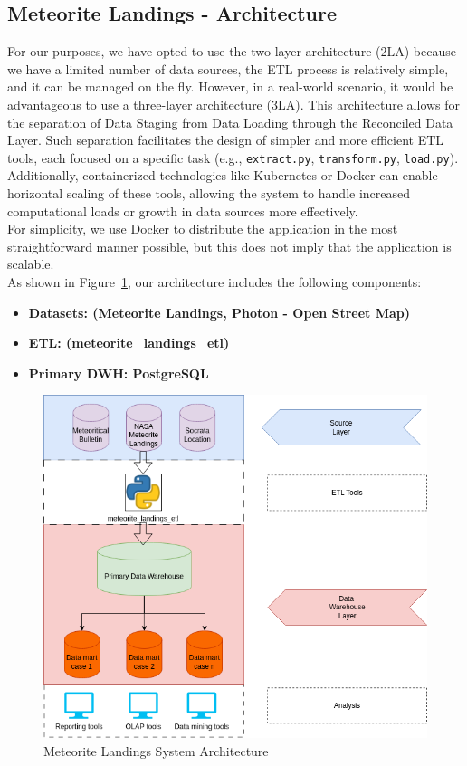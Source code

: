 \documentclass[conference]{IEEEtran}
\begin{document}
	\subsection{Meteorite Landings - Architecture}
	For our purposes, we have opted to use the two-layer architecture (2LA) because we have a limited number of data sources, the ETL process is relatively simple, and it can be managed on the fly. However, in a real-world scenario, it would be advantageous to use a three-layer architecture (3LA). This architecture allows for the separation of Data Staging from Data Loading through the Reconciled Data Layer. Such separation facilitates the design of simpler and more efficient ETL tools, each focused on a specific task (e.g., \texttt{extract.py}, \texttt{transform.py}, \texttt{load.py}). Additionally, containerized technologies like Kubernetes or Docker can enable horizontal scaling of these tools, allowing the system to handle increased computational loads or growth in data sources more effectively.\\For simplicity, we use Docker to distribute the application in the most straightforward manner possible, but this does not imply that the application is scalable.\\As shown in Figure~\ref{fig:Meteorite Landings System Architecture}, our architecture includes the following components:
	\begin{itemize}
		\item \textbf{Datasets: (Meteorite Landings, Photon - Open Street Map)}
		\item \textbf{ETL: (meteorite\_landings\_etl)}
		\item \textbf{Primary DWH: PostgreSQL}  
	\end{itemize}
	\begin{figure}[htpb]
		\centering
		\includegraphics[width=\columnwidth]{images/system_architecture.png}
		\caption{Meteorite Landings System Architecture}
		\label{fig:Meteorite Landings System Architecture}
	\end{figure}
	
\end{document}
